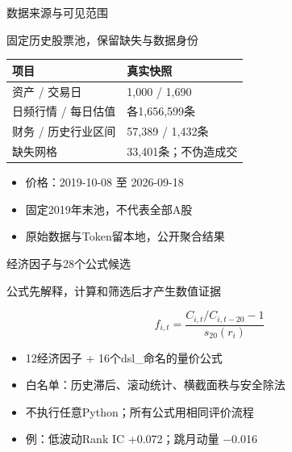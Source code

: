 \documentclass[aspectratio=169,10pt]{beamer}
\begin{document}
\begin{frame}{数据来源与可见范围}
\begin{block}{}固定历史股票池，保留缺失与数据身份\end{block}
\begin{center}\small\begin{tabularx}{.97\textwidth}{lX}\toprule
项目 & 真实快照\\\midrule
资产 / 交易日 & 1,000 / 1,690\\
日频行情 / 每日估值 & 各1,656,599条\\
财务 / 历史行业区间 & 57,389 / 1,432条\\
缺失网格 & 33,401条；不伪造成交\\
\bottomrule\end{tabularx}\end{center}
\small\begin{itemize}
\item 价格：2019-10-08 至 2026-09-18
\item 固定2019年末池，不代表全部A股
\item 原始数据与Token留本地，公开聚合结果
\end{itemize}
\end{frame}

\begin{frame}{经济因子与28个公式候选}
\begin{block}{}公式先解释，计算和筛选后才产生数值证据\end{block}
\[f_{i,t}=\frac{C_{i,t}/C_{i,t-20}-1}{s_{20}(r_i)}\]
\small\begin{itemize}
\item 12经济因子 + 16个dsl\_命名的量价公式
\item 白名单：历史滞后、滚动统计、横截面秩与安全除法
\item 不执行任意Python；所有公式用相同评价流程
\item 例：低波动Rank IC +0.072；跳月动量 −0.016
\end{itemize}
\end{frame}
\end{document}
